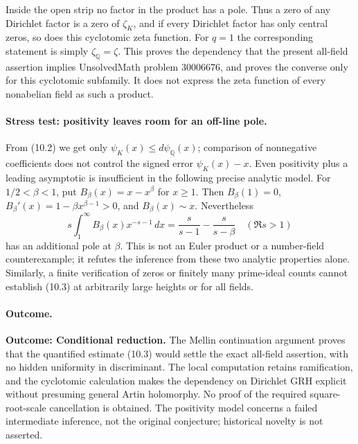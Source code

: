 \documentclass[11pt,a4paper]{article}
\newcommand{\Q}{\mathbb{Q}}
\begin{document}
Inside the open strip no factor in the product has a pole. Thus a zero
of any Dirichlet factor is a zero of $\zeta_K$, and if every Dirichlet
factor has only central zeros, so does this cyclotomic zeta function.
For $q=1$ the corresponding statement is simply $\zeta_{\Q}=\zeta$.
This proves the dependency that the present all-field assertion implies
UnsolvedMath problem 30006676, and proves the converse only for this cyclotomic subfamily.
It does not express the zeta function of every nonabelian field as
such a product.

\paragraph{Stress test: positivity leaves room for an off-line pole.}
From (10.2) we get only $\psi_K(x)\leq d\psi_{\Q}(x)$; comparison of
nonnegative coefficients does not control the signed error
$\psi_K(x)-x$. Even positivity plus a leading asymptotic is insufficient
in the following precise analytic model. For $1/2<\beta<1$, put
$B_\beta(x)=x-x^\beta$ for $x\geq1$. Then
$B_\beta(1)=0$, $B_\beta'(x)=1-\beta x^{\beta-1}>0$,
and $B_\beta(x)\sim x$. Nevertheless
\[
 s\int_1^\infty B_\beta(x)x^{-s-1}\,dx
       =\frac{s}{s-1}-\frac{s}{s-\beta}\quad(\Re s>1)
\]
has an additional pole at $\beta$. This is not an Euler product or a
number-field counterexample; it refutes the inference from these two
analytic properties alone. Similarly, a finite verification of zeros
or finitely many prime-ideal counts cannot establish (10.3) at arbitrarily
large heights or for all fields.

\paragraph{Outcome.}
\textbf{Outcome: Conditional reduction.}
The Mellin continuation argument proves that the quantified estimate
(10.3) would settle the exact all-field assertion, with no hidden
uniformity in discriminant. The local computation retains ramification,
and the cyclotomic calculation makes the dependency on Dirichlet GRH
explicit without presuming general Artin holomorphy. No proof of the
required square-root-scale cancellation is obtained. The positivity
model concerns a failed intermediate inference, not the original
conjecture; historical novelty is not asserted.
\end{document}
